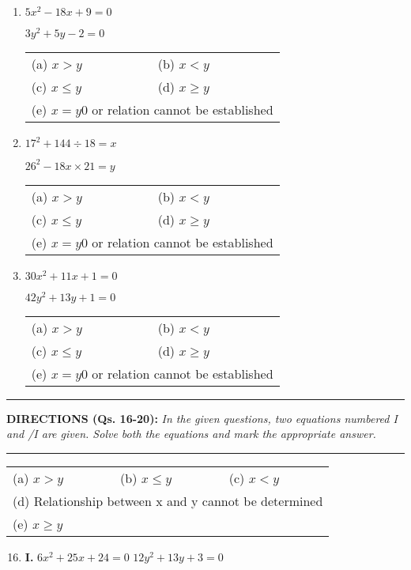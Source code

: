\begin{multicols}{2}
\begin{enumerate}[leftmargin=*]
\item $5x^2 - 18x + 9 = 0$

  $3y^2 + 5y - 2 = 0$


\begin{tabular}{l@{\qquad\quad}l}
(a) $x > y$ & (b) $x < y$\\ 
(c) $x \leq y$ & (d) $x \geq y$\\ 
\multicolumn{2}{l}{(e) $x =y0$ or relation cannot be established}
\end{tabular}
\item $17^2 + 144 \div 18 = x$

  $26^2 - 18x \times 21 = y$

\begin{tabular}{l@{\qquad\quad}l}
(a) $x > y$ & (b) $x < y$\\ 
(c) $x \leq y$ & (d) $x \geq y$\\ 
\multicolumn{2}{l}{(e) $x =y0$ or relation cannot be established}
\end{tabular}

\item $30x^2 + 11x + 1 = 0$

  $42y^2 + 13y + 1 = 0$

\begin{tabular}{l@{\qquad\quad}l}
(a) $x > y$ & (b) $x < y$\\ 
(c) $x \leq y$ & (d) $x \geq y$\\ 
\multicolumn{2}{l}{(e) $x =y0$ or relation cannot be established}
\end{tabular}
\end{enumerate}

\noindent
\rule{\columnwidth}{1pt}

\noindent
{\sf\bfseries DIRECTIONS (Qs. 16-20):} {\it In the given questions, two equations numbered I and /I are given. Solve both the equations and mark the appropriate answer.}

\noindent
\rule{\columnwidth}{1pt}

\begin{tabular}{l@{\qquad\quad}l@{\qquad\quad}l}
(a) $x > y$ & (b) $x \leq y$ & (c) $x < y$\\
\multicolumn{3}{p{7.5cm}}{(d) Relationship between x and y cannot be\newline \phantom{aai} determined}\\
(e) $x \geq y$ & & \\ 
\end{tabular}

\begin{enumerate}[leftmargin=*]
  \setcounter{enumi}{15}
\item {\bf I.} $6x^2 + 25x + 24 = 0$  $12y^2 + 13y + 3 = 0$


\end{enumerate}
\end{multicols}
